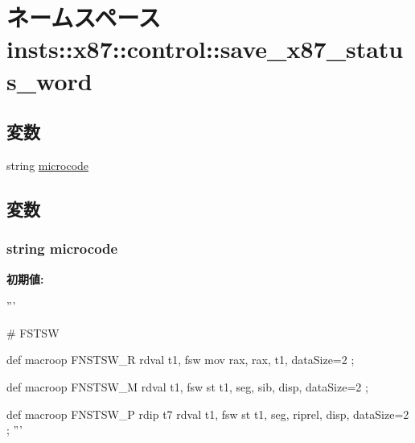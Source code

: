 \hypertarget{namespaceinsts_1_1x87_1_1control_1_1save__x87__status__word}{
\section{ネームスペース insts::x87::control::save\_\-x87\_\-status\_\-word}
\label{namespaceinsts_1_1x87_1_1control_1_1save__x87__status__word}
}
\subsection*{変数}
\begin{DoxyCompactItemize}
\item 
string \hyperlink{namespaceinsts_1_1x87_1_1control_1_1save__x87__status__word_a770f11a173e99389a8802f0107ed8f52}{microcode}
\end{DoxyCompactItemize}


\subsection{変数}
\hypertarget{namespaceinsts_1_1x87_1_1control_1_1save__x87__status__word_a770f11a173e99389a8802f0107ed8f52}{
\subsubsection[{microcode}]{\setlength{\rightskip}{0pt plus 5cm}string {\bf microcode}}}
\label{namespaceinsts_1_1x87_1_1control_1_1save__x87__status__word_a770f11a173e99389a8802f0107ed8f52}
{\bfseries 初期値:}
\begin{DoxyCode}
'''

# FSTSW

def macroop FNSTSW_R {
    rdval t1, fsw
    mov rax, rax, t1, dataSize=2
};

def macroop FNSTSW_M {
    rdval t1, fsw
    st t1, seg, sib, disp, dataSize=2
};

def macroop FNSTSW_P {
    rdip t7
    rdval t1, fsw
    st t1, seg, riprel, disp, dataSize=2
};
'''
\end{DoxyCode}
